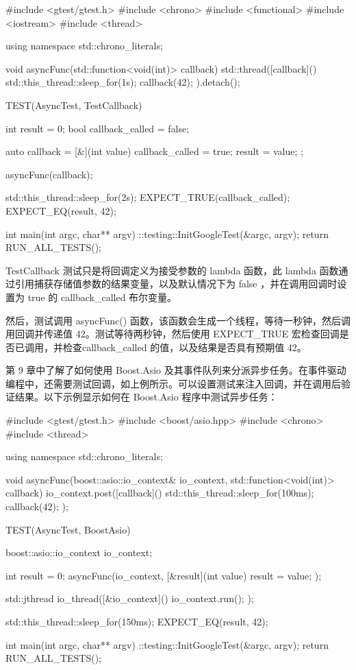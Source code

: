 \begin{cpp}
#include <gtest/gtest.h>
#include <chrono>
#include <functional>
#include <iostream>
#include <thread>

using namespace std::chrono_literals;

void asyncFunc(std::function<void(int)> callback) {
    std::thread([callback]() {
        std::this_thread::sleep_for(1s);
        callback(42);
    }).detach();
}

TEST(AsyncTest, TestCallback) {
    int result = 0;
    bool callback_called = false;

    auto callback = [&](int value) {
        callback_called = true;
        result = value;
    };

    asyncFunc(callback);

    std::this_thread::sleep_for(2s);
    EXPECT_TRUE(callback_called);
    EXPECT_EQ(result, 42);
}

int main(int argc, char** argv) {
    ::testing::InitGoogleTest(&argc, argv);
    return RUN_ALL_TESTS();
}
\end{cpp}

TestCallback 测试只是将回调定义为接受参数的 lambda 函数，此 lambda 函数通过引用捕获存储值参数的结果变量，以及默认情况下为 false ，并在调用回调时设置为 true 的 callback\_called 布尔变量。

然后，测试调用 asyncFunc() 函数，该函数会生成一个线程，等待一秒钟，然后调用回调并传递值 42。测试等待两秒钟，然后使用 EXPECT\_TRUE 宏检查回调是否已调用，并检查callback\_called 的值，以及结果是否具有预期值 42。


第 9 章中了解了如何使用 Boost.Asio 及其事件队列来分派异步任务。在事件驱动编程中，还需要测试回调，如上例所示。可以设置测试来注入回调，并在调用后验证结果。以下示例显示如何在 Boost.Asio 程序中测试异步任务：

\begin{cpp}
#include <gtest/gtest.h>
#include <boost/asio.hpp>
#include <chrono>
#include <thread>

using namespace std::chrono_literals;

void asyncFunc(boost::asio::io_context& io_context,
               std::function<void(int)> callback) {
    io_context.post([callback]() {
        std::this_thread::sleep_for(100ms);
        callback(42);
    });
}

TEST(AsyncTest, BoostAsio) {
    boost::asio::io_context io_context;

    int result = 0;
    asyncFunc(io_context, [&result](int value) {
        result = value;
    });

    std::jthread io_thread([&io_context]() {
        io_context.run();
    });

    std::this_thread::sleep_for(150ms);
    EXPECT_EQ(result, 42);
}

int main(int argc, char** argv) {
    ::testing::InitGoogleTest(&argc, argv);
    return RUN_ALL_TESTS();
}
\end{cpp}

